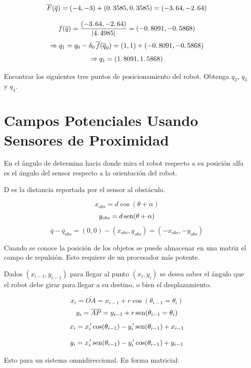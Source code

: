 $$\overline{F}(\overline{q}) = (-4,-3) + (0\ldotp3585,0\ldotp3585) = (-3\ldotp64,-2\ldotp64)$$

$$f(\overline{q}) = \dfrac{(-3\ldotp64,-2\ldotp64)}{|4\ldotp4985|} = (-0\ldotp8091,-0\ldotp5868)$$
$$ \Rightarrow q_{1} = q_{0} - \delta_{0}\,\overline{f}(\overline{q}_{0}) = (1,1) + (-0\ldotp8091,-0\ldotp5868)$$
$$\Rightarrow q_{1} = (1\ldotp8091,1\ldotp5868)$$

Encontrar los siguientes tres puntos de posicionamiento del robot. Obtenga $q_{2}$, $q_{3}$ y $q_{4}$.


\section{Campos Potenciales Usando Sensores de Proximidad}


En el ángulo de determina hacia donde mira el robot respecto a su posición alfa es el ángulo del sensor respecto a la orientación del robot. 

D es la distancia reportada por el sensor al obstáculo. 

$$x_{obs} = d\cos (\theta + \alpha)$$
$$y_{obs} = d\mathop{\rm sen}\nolimits (\theta + \alpha)$$
$$\overline{q} - \overline{q}_{obs} = (0,0) - (x_{obs}, y_{obs}) = (-x_{obs}, -y_{obs})$$


Cuando se conoce la posición de los objetos se puede almacenar en una matriz el campo de repulsión. Esto requiere de un procesador más potente.


Dados $(x_{i - 1}, y_{i - 1})$ para llegar al punto $(x_{i}, y_{i})$ se desea saber el ángulo que el robot debe girar para llegar a su destino, o bien el desplazamiento.

$$x_{i} = \overline{OA} = x_{i - 1} + r\cos (\theta_{i - 1} = \theta_{i})$$
$$y_{i} = \overline{AP} = y_{i - 1} + r\mathop{\rm sen}\nolimits (\theta_{i - 1} = \theta_{i})$$
$$x_{i} = x_{i}^{\,\prime} \cos (\theta_{i - 1}) - y_{i}^{\,\prime} \mathop{\rm sen}\nolimits (\theta_{i - 1}) + x_{i - 1}$$

$$y_{i} = x_{i}^{\,\prime} \mathop{\rm sen}\nolimits (\theta_{i - 1}) - y_{i}^{\,\prime} \cos (\theta_{i - 1}) + y_{i - 1}$$

Esto para un sistema omnidireccional. En forma matricial:

